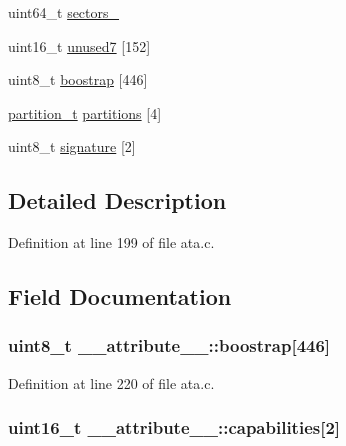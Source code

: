 \begin{DoxyCompactItemize}
uint64\+\_\+t \hyperlink{struct____attribute_____ad9d8935f5c8aa639c75860621cbcaeef}{sectors\+\_}
\item 
uint16\+\_\+t \hyperlink{struct____attribute_____a3ca12260c33c9b1431db806c9dcfe209}{unused7} \mbox{[}152\mbox{]}
\item 
uint8\+\_\+t \hyperlink{struct____attribute_____a91badd2352f9652b3d46be652188d843}{boostrap} \mbox{[}446\mbox{]}
\item 
\hyperlink{structpartition__t}{partition\+\_\+t} \hyperlink{struct____attribute_____aa806510421b3faee3fdc3de2dad5e822}{partitions} \mbox{[}4\mbox{]}
\item 
uint8\+\_\+t \hyperlink{struct____attribute_____aaee33b58b76a81f69b6f3c5bb225c571}{signature} \mbox{[}2\mbox{]}
\end{DoxyCompactItemize}


\subsection{Detailed Description}


Definition at line 199 of file ata.\+c.



\subsection{Field Documentation}
\subsubsection[{\texorpdfstring{boostrap}{boostrap}}]{\setlength{\rightskip}{0pt plus 5cm}uint8\+\_\+t \+\_\+\+\_\+attribute\+\_\+\+\_\+\+::boostrap\mbox{[}446\mbox{]}}\hypertarget{struct____attribute_____a91badd2352f9652b3d46be652188d843}{}\label{struct____attribute_____a91badd2352f9652b3d46be652188d843}


Definition at line 220 of file ata.\+c.

\subsubsection[{\texorpdfstring{capabilities}{capabilities}}]{\setlength{\rightskip}{0pt plus 5cm}uint16\+\_\+t \+\_\+\+\_\+attribute\+\_\+\+\_\+\+::capabilities\mbox{[}2\mbox{]}}\hypertarget{struct____attribute_____a77a668765fcd25abfe5b7e5f4ee85108}{}\label{struct____attribute_____a77a668765fcd25abfe5b7e5f4ee85108}



